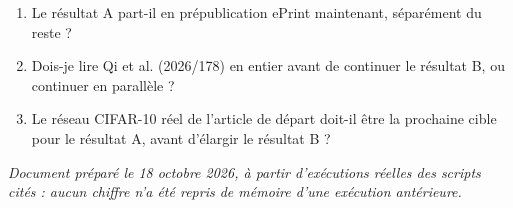 \documentclass[11pt]{article}
\begin{document}
\begin{enumerate}
  \item Le résultat A part-il en prépublication ePrint maintenant, séparément du reste ?
  \item Dois-je lire Qi et al. (2026/178) en entier avant de continuer le résultat B, ou continuer en parallèle ?
  \item Le réseau CIFAR-10 réel de l'article de départ doit-il être la prochaine cible pour le résultat A, avant d'élargir le résultat B ?
\end{enumerate}

\bigskip
\noindent\textit{Document préparé le 18 octobre 2026, à partir d'exécutions réelles des scripts cités : aucun chiffre n'a été repris de mémoire d'une exécution antérieure.}
\end{document}

